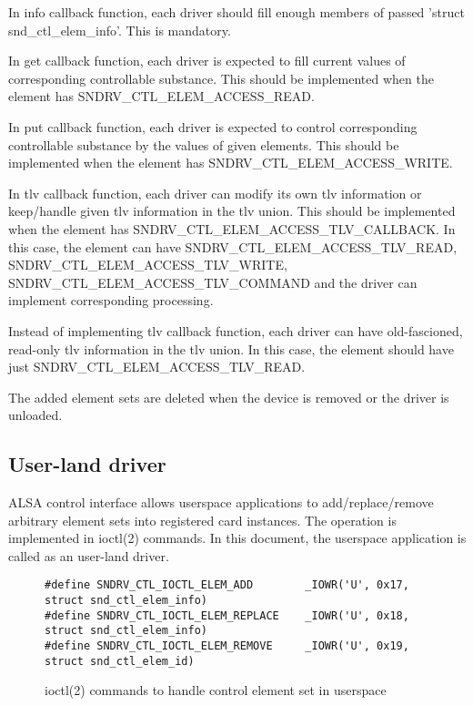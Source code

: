 \documentclass[onecolumn]{article}
\begin{document}
In info callback function, each driver should fill enough members of passed 'struct snd\_ctl\_elem\_info'. This is mandatory.

In get callback function, each driver is expected to fill current values of corresponding controllable substance. This should be implemented when the element has SNDRV\_CTL\_ELEM\_ACCESS\_READ.

In put callback function, each driver is expected to control corresponding controllable substance by the values of given elements. This should be implemented when the element has SNDRV\_CTL\_ELEM\_ACCESS\_WRITE.

In tlv callback function, each driver can modify its own tlv information or keep/handle given tlv information in the tlv union. This should be implemented when the element has SNDRV\_CTL\_ELEM\_ACCESS\_TLV\_CALLBACK. In this case, the element can have SNDRV\_CTL\_ELEM\_ACCESS\_TLV\_READ, SNDRV\_CTL\_ELEM\_ACCESS\_TLV\_WRITE, SNDRV\_CTL\_ELEM\_ACCESS\_TLV\_COMMAND and the driver can implement corresponding processing.

Instead of implementing tlv callback function, each driver can have old-fascioned, read-only tlv information in the tlv union. In this case, the element should have just SNDRV\_CTL\_ELEM\_ACCESS\_TLV\_READ.

The added element sets are deleted when the device is removed or the driver is unloaded.


\subsection{User-land driver}

ALSA control interface allows userspace applications to add/replace/remove arbitrary element sets into registered card instances. The operation is implemented in ioctl(2) commands. In this document, the userspace application is called as an user-land driver.

\begin{figure}[htbp]
\small
\begin{verbatim}
#define SNDRV_CTL_IOCTL_ELEM_ADD        _IOWR('U', 0x17, struct snd_ctl_elem_info)
#define SNDRV_CTL_IOCTL_ELEM_REPLACE    _IOWR('U', 0x18, struct snd_ctl_elem_info)
#define SNDRV_CTL_IOCTL_ELEM_REMOVE     _IOWR('U', 0x19, struct snd_ctl_elem_id)
\end{verbatim}
\caption{{ioctl(2) commands to handle control element set in userspace}}
\label{ioctl-commands-userspace-element}
\end{figure}
\end{document}
